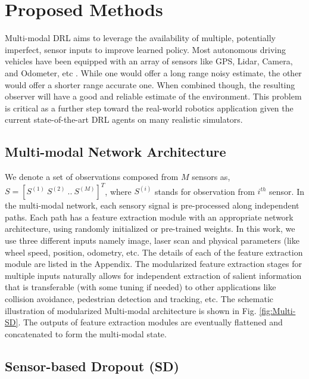 \documentclass[../thesis.tex]{subfiles}
\begin{document}
\section{Proposed Methods} \label{sec:mdrl-proposed}

Multi-modal DRL aims to leverage the availability of multiple, potentially imperfect, sensor inputs to improve learned policy. Most autonomous driving vehicles have been equipped with an array of sensors like GPS, Lidar, Camera, and Odometer, etc \cite{hudda2013self}. While one would offer a long range noisy estimate, the other would offer a shorter range accurate one. When combined though, the resulting observer will have a good and reliable estimate of the environment. This problem is critical as a further step toward the real-world robotics application given the current state-of-the-art DRL agents on many realistic simulators. 


\subsection{Multi-modal Network Architecture}


We denote a set of observations composed from $M$ sensors as, $S = [S^{(1)}~S^{(2)}~..~S^{(M)}]^T$, where $S^{(i)}$ stands for observation from $i^{th}$ sensor. In the multi-modal network, each sensory signal is pre-processed along independent paths. Each path has a feature extraction module with an appropriate network architecture, using randomly initialized or pre-trained weights. In this work, we use three different inputs namely image, laser scan and physical parameters (like wheel speed, position, odometry, etc. The details of each of the feature extraction module are listed in the Appendix. The modularized feature extraction stages for multiple inputs naturally allows for independent extraction of salient information that is transferable (with some tuning if needed) to other applications like collision avoidance, pedestrian detection and tracking, etc. The schematic illustration of modularized Multi-modal architecture is shown in Fig. \ref{fig:Multi-SD}. The outputs of feature extraction modules are eventually flattened and concatenated to form the multi-modal state. 

\subsection{Sensor-based Dropout (SD)} \label{sec:SD}
\end{document}
